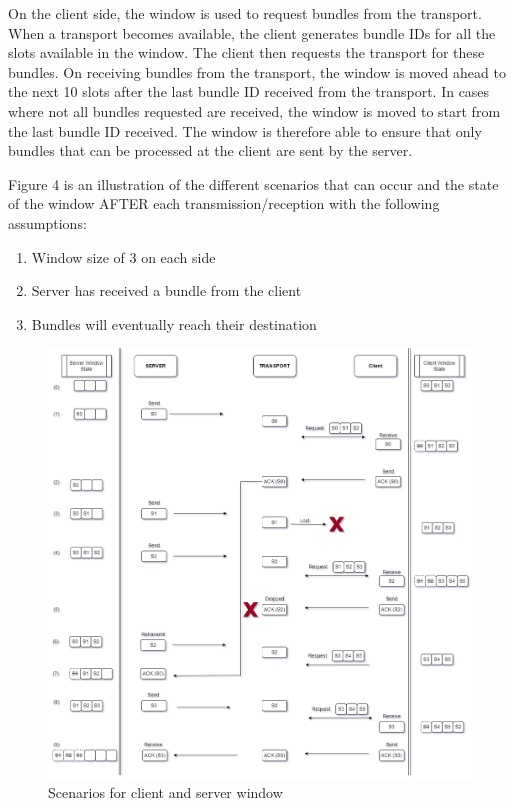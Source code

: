 On the client side, the window is used to request bundles from the transport. When a transport becomes available, the client generates bundle IDs for all the slots available in the window. The client then requests the transport for these bundles. On receiving bundles from the transport, the window is moved ahead to the next 10 slots after the last bundle ID received from the transport. In cases where not all bundles requested are received, the window is moved to start from the last bundle ID received.
The window is therefore able to ensure that only bundles that can be processed at the client are sent by the server.

Figure 4 is an illustration of the different scenarios that can occur and the state of the window AFTER each transmission/reception with the following assumptions: 
\begin{enumerate}[label=(\arabic*)]
\item Window size of 3 on each side
\item Server has received a bundle from the client
\item Bundles will eventually reach their destination
\end{enumerate}

\begin{figure}[ht!]
\centering
\includegraphics[width= 150mm]{./images/Window_scenarios.drawio.png}
\caption{Scenarios for client and server window}
\end{figure}

